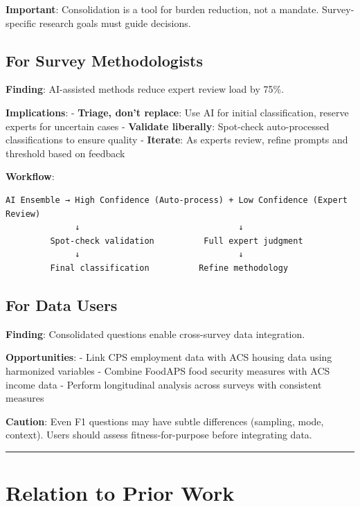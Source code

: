 \documentclass[
  letterpaper,
]{report}
\begin{document}
\textbf{Important}: Consolidation is a tool for burden reduction, not a
mandate. Survey-specific research goals must guide decisions.

\subsection{For Survey Methodologists}\label{for-survey-methodologists}

\textbf{Finding}: AI-assisted methods reduce expert review load by 75\%.

\textbf{Implications}: - \textbf{Triage, don't replace}: Use AI for
initial classification, reserve experts for uncertain cases -
\textbf{Validate liberally}: Spot-check auto-processed classifications
to ensure quality - \textbf{Iterate}: As experts review, refine prompts
and threshold based on feedback

\textbf{Workflow}:

\begin{verbatim}
AI Ensemble → High Confidence (Auto-process) + Low Confidence (Expert Review)
              ↓                                ↓
         Spot-check validation          Full expert judgment
              ↓                                ↓
         Final classification          Refine methodology
\end{verbatim}

\subsection{For Data Users}\label{for-data-users}

\textbf{Finding}: Consolidated questions enable cross-survey data
integration.

\textbf{Opportunities}: - Link CPS employment data with ACS housing data
using harmonized variables - Combine FoodAPS food security measures with
ACS income data - Perform longitudinal analysis across surveys with
consistent measures

\textbf{Caution}: Even F1 questions may have subtle differences
(sampling, mode, context). Users should assess fitness-for-purpose
before integrating data.

\begin{center}\rule{0.5\linewidth}{0.5pt}\end{center}

\section{Relation to Prior Work}\label{relation-to-prior-work}
\end{document}
